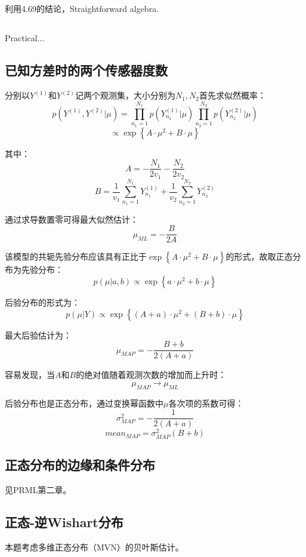 \documentclass[UTF8]{ctexart}
\begin{document}
\subsection{}
利用4.69的结论，Straightforward algebra.

\subsection{}
Practical...

\subsection{已知方差时的两个传感器度数}
分别以$Y^{(1)}$和$Y^{(2)}$记两个观测集，大小分别为$N_{1},N_{2}$首先求似然概率：
$$p(Y^{(1)},Y^{(2)}|\mu)=\prod_{n_{1}=1}^{N_{1}}p(Y^{(1)}_{n_{1}}|\mu)\prod_{n_{2}=1}^{N_{2}}p(Y^{(2)}_{n_{2}}|\mu)$$
$$\propto \exp\left\{ A\cdot \mu^{2} + B \cdot \mu \right\}$$

其中：
$$A=-\frac{N_{1}}{2v_{1}}-\frac{N_{2}}{2v_{2}}$$
$$B=\frac{1}{v_{1}}\sum_{n_{1}=1}^{N_{1}}Y^{(1)}_{n_{1}} + \frac{1}{v_{2}}\sum_{n_{2}=1}^{N_{2}}Y^{(2)}_{n_{2}}$$

通过求导数置零可得最大似然估计：
$$\mu_{ML} = -\frac{B}{2A}$$

该模型的共轭先验分布应该具有正比于$\exp\left\{A\cdot\mu^{2} + B\cdot\mu\right\}$的形式，故取正态分布为先验分布：
$$p(\mu|a,b) \propto \exp\left\{ a\cdot \mu^{2} + b\cdot \mu \right\}$$

后验分布的形式为：
$$p(\mu|Y) \propto \exp\left\{ (A+a)\cdot \mu^{2} + (B+b)\cdot \mu \right\}$$

最大后验估计为：
$$\mu_{MAP} = -\frac{B+b}{2(A+a)}$$

容易发现，当$A$和$B$的绝对值随着观测次数的增加而上升时：
$$\mu_{MAP} \rightarrow \mu_{ML}$$

后验分布也是正态分布，通过变换幂函数中$\mu$各次项的系数可得：
$$\sigma^{2}_{MAP} = -\frac{1}{2(A+a)}$$
$$mean_{MAP} = \sigma^{2}_{MAP}(B+b)$$

\subsection{正态分布的边缘和条件分布}
见PRML第二章。

\subsection{正态-逆Wishart分布}
本题考虑多维正态分布（MVN）的贝叶斯估计。
\end{document}
